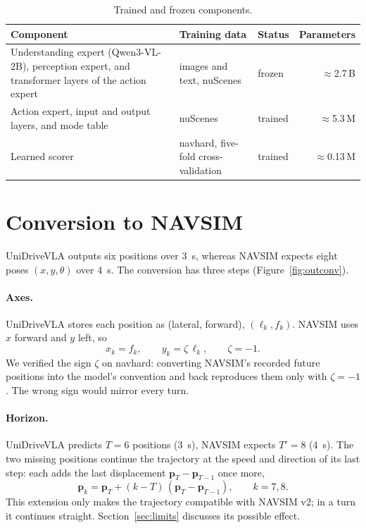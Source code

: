 \documentclass[11pt, a4paper, oneside]{book}
\begin{document}
\begin{table}[ht]
\centering
\caption[Trained and frozen components]{Trained and frozen components.}
\label{tab:stages}
\begin{tabularx}{\linewidth}{@{}>{\raggedright\arraybackslash}X >{\raggedright\arraybackslash}X l r@{}}
\toprule
Component & Training data & Status & Parameters \\
\midrule
Understanding expert (Qwen3-VL-2B), perception expert, and transformer layers of the action expert & images and text, nuScenes & frozen & $\approx$2.7\,B \\
Action expert, input and output layers, and mode table & nuScenes & trained & $\approx$5.3\,M \\
Learned scorer & navhard, five-fold cross-validation & trained & $\approx$0.13\,M \\
\bottomrule
\end{tabularx}
\end{table}



\section{Conversion to NAVSIM}
\label{sec:output}
UniDriveVLA outputs six positions over \SI{3}{\second}, whereas NAVSIM expects eight poses
$(x,y,\theta)$ over \SI{4}{\second}. The conversion has three steps (Figure~\ref{fig:outconv}).

\paragraph{Axes.} UniDriveVLA stores each position as (lateral, forward), $(\ell_k,f_k)$.
NAVSIM uses $x$ forward and $y$ left, so
\begin{equation}
  x_k=f_k,\qquad y_k=\zeta\,\ell_k,\qquad \zeta=-1 .
\end{equation}
We verified the sign $\zeta$ on navhard: converting NAVSIM's recorded future positions into
the model's convention and back reproduces them only with $\zeta=-1$. The wrong sign would
mirror every turn.

\paragraph{Horizon.} UniDriveVLA predicts $T=6$ positions (\SI{3}{\second}), NAVSIM expects
$T'=8$ (\SI{4}{\second}). The two missing positions continue the trajectory at the speed and
direction of its last step: each adds the last displacement $\mathbf{p}_T-\mathbf{p}_{T-1}$
once more,
\begin{equation}
  \mathbf{p}_k=\mathbf{p}_T+(k-T)\,(\mathbf{p}_T-\mathbf{p}_{T-1}),\qquad k=7,8 .
\end{equation}
This extension only makes the trajectory compatible with NAVSIM v2; in a turn it continues
straight. Section~\ref{sec:limits} discusses its possible effect.
\end{document}
